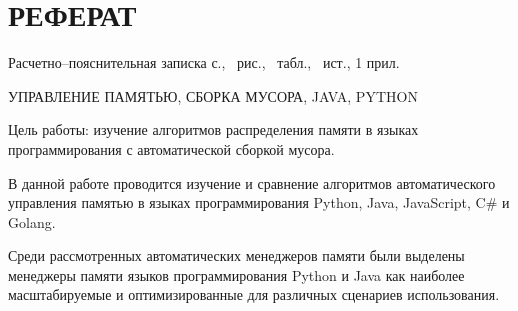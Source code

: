 \part*{РЕФЕРАТ}

Расчетно--пояснительная записка \pageref{LastPage} с., \totalfigures\ рис., \totaltables\ табл., \thetotalbibentries\ ист., 1 прил.

УПРАВЛЕНИЕ ПАМЯТЬЮ, СБОРКА МУСОРА, JAVA, PYTHON

Цель работы: изучение алгоритмов распределения памяти в языках программирования с автоматической сборкой мусора.

В данной работе проводится изучение и сравнение алгоритмов автоматического управления памятью в языках программирования Python, Java, JavaScript, C\# и Golang.

Среди рассмотренных автоматических менеджеров памяти были выделены менеджеры памяти языков программирования Python и Java как наиболее масштабируемые и оптимизированные для различных сценариев использования.
